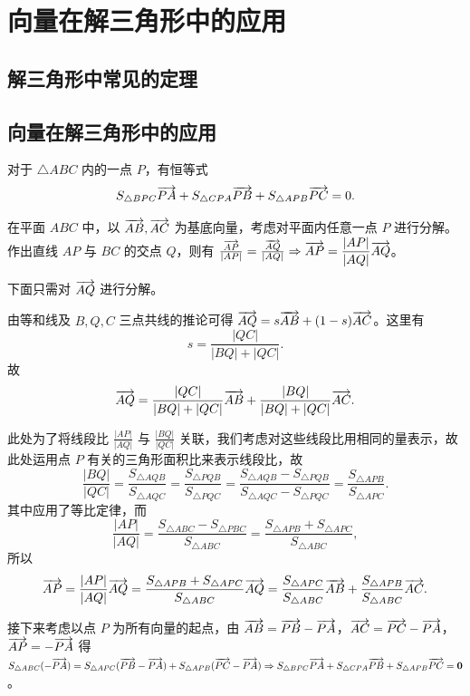 \section{向量在解三角形中的应用}
\subsection{解三角形中常见的定理}
\clearpage
\subsection{向量在解三角形中的应用}
\begin{theorem}[奔驰定理]
    对于 \(\triangle ABC\) 内的一点 \(P\)，有恒等式
    \[
    S_{\triangle BPC} \overrightarrow{PA} + S_{\triangle CPA} \overrightarrow{PB} + S_{\triangle APB} \overrightarrow{PC} = 0.
    \]
\end{theorem}


在平面 \(ABC\) 中，以 \(\overrightarrow{AB}, \overrightarrow{AC}\) 为基底向量，考虑对平面内任意一点 \(P\) 进行分解。
作出直线 \(AP\) 与 \(BC\) 的交点 \(Q\)，则有 \(\frac{\overrightarrow{AP}}{|AP|} = \frac{\overrightarrow{AQ}}{|AQ|} \Rightarrow \overrightarrow{AP} = \dfrac{|AP|}{|AQ|}\overrightarrow{AQ}\)。

下面只需对 \(\overrightarrow{AQ}\) 进行分解。

由等和线及 \(B, Q, C\) 三点共线的推论可得 \(\overrightarrow{AQ} = s\overrightarrow{AB} + (1-s)\overrightarrow{AC}\)。这里有
\[
s = \frac{|QC|}{|BQ| +|QC|}.
\]
故
\[
\overrightarrow{AQ} = \frac{|QC|}{|BQ|+|QC|} \overrightarrow{AB} + \frac{|BQ|}{|BQ|+|QC|} \overrightarrow{AC}.
\]

此处为了将线段比 \(\frac{|AP|}{|AQ|}\) 与 \(\frac{|BQ|}{|QC|}\) 关联，我们考虑对这些线段比用相同的量表示，故此处运用点 \(P\) 有关的三角形面积比来表示线段比，故
\[
\frac{|BQ|}{|QC|} = \frac{S_{\triangle AQB}}{S_{\triangle AQC}} = \frac{S_{\triangle PQB}}{S_{\triangle PQC}} = \frac{S_{\triangle AQB} - S_{\triangle PQB}}{S_{\triangle AQC} - S_{\triangle PQC}} = \frac{S_{\triangle APB}}{S_{\triangle APC}}.
\]
其中应用了等比定律，而
\[
\frac{|AP|}{|AQ|} = \frac{S_{\triangle ABC} - S_{\triangle PBC}}{S_{\triangle ABC}} = \frac{S_{\triangle APB} + S_{\triangle APC}}{S_{\triangle ABC}},
\]
所以
\[
\overrightarrow{AP} = \frac{|AP|}{|AQ|} \overrightarrow{AQ} = \frac{S_{\triangle APB} + S_{\triangle APC}}{S_{\triangle ABC}} \overrightarrow{AQ} = \frac{S_{\triangle APC}}{S_{\triangle ABC}} \overrightarrow{AB} + \frac{S_{\triangle APB}}{S_{\triangle ABC}} \overrightarrow{AC}.
\]

接下来考虑以点 \(P\) 为所有向量的起点，由 \(\overrightarrow{AB} = \overrightarrow{PB} - \overrightarrow{PA}\)，\(\overrightarrow{AC} = \overrightarrow{PC} - \overrightarrow{PA}\)，\(\overrightarrow{AP} = -\overrightarrow{PA}\) 得 \(S_{\triangle ABC}(-\overrightarrow{PA}) = S_{\triangle APC}(\overrightarrow{PB} - \overrightarrow{PA}) + S_{\triangle APB}(\overrightarrow{PC} - \overrightarrow{PA}) \Rightarrow S_{\triangle BPC} \overrightarrow{PA} + S_{\triangle CPA} \overrightarrow{PB} + S_{\triangle APB} \overrightarrow{PC} = \boldsymbol{0}\)。

